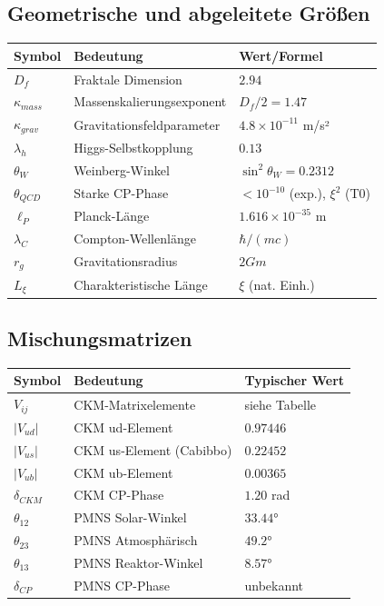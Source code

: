 \subsection{Geometrische und abgeleitete Größen}
\begin{longtable}{lll}
	\toprule
	\textbf{Symbol} & \textbf{Bedeutung} & \textbf{Wert/Formel} \\
	\midrule
	$D_f$ & Fraktale Dimension & $2.94$ \\
	$\kappa_{mass}$ & Massenskalierungsexponent & $D_f/2 = 1.47$ \\
	$\kappa_{grav}$ & Gravitationsfeldparameter & $4.8 \times 10^{-11}$ m/s² \\
	$\lambda_h$ & Higgs-Selbstkopplung & $0.13$ \\
	$\theta_W$ & Weinberg-Winkel & $\sin^2\theta_W = 0.2312$ \\
	$\theta_{QCD}$ & Starke CP-Phase & $< 10^{-10}$ (exp.), $\xi^2$ (T0) \\
	$\ell_P$ & Planck-Länge & $1.616 \times 10^{-35}$ m \\
	$\lambda_C$ & Compton-Wellenlänge & $\hbar/(mc)$ \\
	$r_g$ & Gravitationsradius & $2Gm$ \\
	$L_\xi$ & Charakteristische Länge & $\xi$ (nat. Einh.) \\
	\bottomrule
\end{longtable}

\subsection{Mischungsmatrizen}
\begin{longtable}{lll}
	\toprule
	\textbf{Symbol} & \textbf{Bedeutung} & \textbf{Typischer Wert} \\
	\midrule
	$V_{ij}$ & CKM-Matrixelemente & siehe Tabelle \\
	$|V_{ud}|$ & CKM ud-Element & $0.97446$ \\
	$|V_{us}|$ & CKM us-Element (Cabibbo) & $0.22452$ \\
	$|V_{ub}|$ & CKM ub-Element & $0.00365$ \\
	$\delta_{CKM}$ & CKM CP-Phase & $1.20$ rad \\
	$\theta_{12}$ & PMNS Solar-Winkel & $33.44°$ \\
	$\theta_{23}$ & PMNS Atmosphärisch & $49.2°$ \\
	$\theta_{13}$ & PMNS Reaktor-Winkel & $8.57°$ \\
	$\delta_{CP}$ & PMNS CP-Phase & unbekannt \\
	\bottomrule
\end{longtable}

